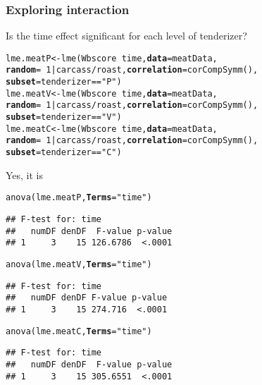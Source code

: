 \documentclass[color=usenames,dvipsnames]{beamer}\usepackage[]{graphicx}\usepackage[]{color}
\makeatletter
\newcommand{\hlnum}[1]{\textcolor[rgb]{0.69,0.494,0}{#1}}%
\newcommand{\hlstr}[1]{\textcolor[rgb]{0.749,0.012,0.012}{#1}}%
\newcommand{\hlopt}[1]{\textcolor[rgb]{0,0,0}{#1}}%
\newcommand{\hlstd}[1]{\textcolor[rgb]{0,0,0}{#1}}%
\newcommand{\hlkwb}[1]{\textcolor[rgb]{0,0.341,0.682}{#1}}%
\newcommand{\hlkwc}[1]{\textcolor[rgb]{0,0,0}{\textbf{#1}}}%
\newcommand{\hlkwd}[1]{\textcolor[rgb]{0.004,0.004,0.506}{#1}}%
\newenvironment{kframe}{%
 \def\at@end@of@kframe{}%
 \ifinner\ifhmode%
  \def\at@end@of@kframe{\end{minipage}}%
  \begin{minipage}{\columnwidth}%
 \fi\fi%
 \def\FrameCommand##1{\hskip\@totalleftmargin \hskip-\fboxsep
 \colorbox{shadecolor}{##1}\hskip-\fboxsep
     \hskip-\linewidth \hskip-\@totalleftmargin \hskip\columnwidth}%
 \MakeFramed {\advance\hsize-\width
   \@totalleftmargin\z@ \linewidth\hsize
   \@setminipage}}%
 {\par\unskip\endMakeFramed%
 \at@end@of@kframe}
\newenvironment{knitrout}{}{} %
\makeatother
\begin{document}
\begin{frame}[fragile]
  \frametitle{Exploring interaction}
  \small
  Is the time effect significant for each level of tenderizer?
\begin{knitrout}\tiny
{}\color{fgcolor}\begin{kframe}
\begin{alltt}
\hlstd{lme.meatP} \hlkwb{<-} \hlkwd{lme}\hlstd{(Wbscore} \hlopt{~} \hlstd{time,} \hlkwc{data}\hlstd{=meatData,}
                 \hlkwc{random} \hlstd{=} \hlopt{~}\hlnum{1}\hlopt{|}\hlstd{carcass}\hlopt{/}\hlstd{roast,} \hlkwc{correlation}\hlstd{=}\hlkwd{corCompSymm}\hlstd{(),}
                 \hlkwc{subset}\hlstd{=tenderizer}\hlopt{==}\hlstr{"P"}\hlstd{)}
\hlstd{lme.meatV} \hlkwb{<-} \hlkwd{lme}\hlstd{(Wbscore} \hlopt{~} \hlstd{time,} \hlkwc{data}\hlstd{=meatData,}
                 \hlkwc{random} \hlstd{=} \hlopt{~}\hlnum{1}\hlopt{|}\hlstd{carcass}\hlopt{/}\hlstd{roast,}\hlkwc{correlation}\hlstd{=}\hlkwd{corCompSymm}\hlstd{(),}
                 \hlkwc{subset}\hlstd{=tenderizer}\hlopt{==}\hlstr{"V"}\hlstd{)}
\hlstd{lme.meatC} \hlkwb{<-} \hlkwd{lme}\hlstd{(Wbscore} \hlopt{~} \hlstd{time,} \hlkwc{data}\hlstd{=meatData,}
                 \hlkwc{random} \hlstd{=} \hlopt{~}\hlnum{1}\hlopt{|}\hlstd{carcass}\hlopt{/}\hlstd{roast,} \hlkwc{correlation}\hlstd{=}\hlkwd{corCompSymm}\hlstd{(),}
                 \hlkwc{subset}\hlstd{=tenderizer}\hlopt{==}\hlstr{"C"}\hlstd{)}
\end{alltt}
\end{kframe}
\end{knitrout}
\pause
\vfill
\small %
Yes, it is
\begin{knitrout}\tiny
{}\color{fgcolor}\begin{kframe}
\begin{alltt}
\hlkwd{anova}\hlstd{(lme.meatP,} \hlkwc{Terms}\hlstd{=}\hlstr{"time"}\hlstd{)}
\end{alltt}
\begin{verbatim}
## F-test for: time 
##   numDF denDF  F-value p-value
## 1     3    15 126.6786  <.0001
\end{verbatim}
\begin{alltt}
\hlkwd{anova}\hlstd{(lme.meatV,} \hlkwc{Terms}\hlstd{=}\hlstr{"time"}\hlstd{)}
\end{alltt}
\begin{verbatim}
## F-test for: time 
##   numDF denDF F-value p-value
## 1     3    15 274.716  <.0001
\end{verbatim}
\begin{alltt}
\hlkwd{anova}\hlstd{(lme.meatC,} \hlkwc{Terms}\hlstd{=}\hlstr{"time"}\hlstd{)}
\end{alltt}
\begin{verbatim}
## F-test for: time 
##   numDF denDF  F-value p-value
## 1     3    15 305.6551  <.0001
\end{verbatim}
\end{kframe}
\end{knitrout}

\end{frame}
\end{document}
